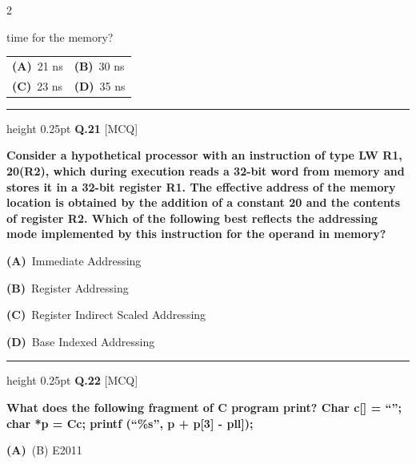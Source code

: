 \documentclass[a4paper,10pt,twoside]{article}
\begin{document}
\begin{multicols}{2}
{time for the memory? \par}
\par\vspace{2pt}\noindent
\begin{tabular*}{\columnwidth}{@{\extracolsep{\fill}}p{}p{}@{}}
\textbf{(A)}~21 ns & \textbf{(B)}~30 ns \\
\addlinespace[2pt]
\textbf{(C)}~23 ns & \textbf{(D)}~35 ns
\end{tabular*}
\par\vspace{6pt}\hrule height 0.25pt\vspace{6pt}
\noindent\textbf{Q.21} \hfill {\footnotesize\textsf{[MCQ]}}
\par\vspace{2pt}
{\bfseries Consider a hypothetical processor with an instruction of type LW R1, 20(R2), which during
execution reads a 32-bit word from memory and stores it in a 32-bit register R1. The effective
address of the memory location is obtained by the addition of a constant 20 and the contents of
register R2. Which of the following best reflects the addressing mode implemented by this
instruction for the operand in memory? \par}
\par\vspace{2pt}\noindent
\textbf{(A)}~Immediate Addressing\par\vspace{2pt}\noindent
\textbf{(B)}~Register Addressing\par\vspace{2pt}\noindent
\textbf{(C)}~Register Indirect Scaled Addressing\par\vspace{2pt}\noindent
\textbf{(D)}~Base Indexed Addressing
\par\vspace{6pt}\hrule height 0.25pt\vspace{6pt}
\noindent\textbf{Q.22} \hfill {\footnotesize\textsf{[MCQ]}}
\par\vspace{2pt}
{\bfseries What does the following fragment of C program print?
Char c[] = ``'';
char *p = Cc;
printf (``\%s'', p + p[3] - pll]); \par}
\par\vspace{2pt}\noindent
\textbf{(A)}~(B) E2011\par\vspace{2pt}\noindent

\end{multicols}
\end{document}
